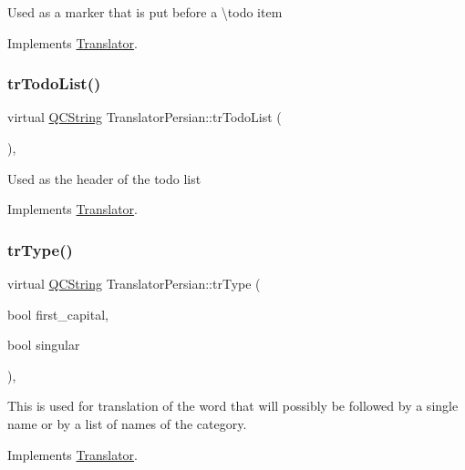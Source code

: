 Used as a marker that is put before a \textbackslash{}todo item 

Implements \mbox{\hyperlink{class_translator}{Translator}}.

\mbox{\label{class_translator_persian_aab0a2e82545289bc3d0695d290f8fd64}} 
\subsubsection{\texorpdfstring{trTodoList()}{trTodoList()}}
{\footnotesize\ttfamily virtual \mbox{\hyperlink{class_q_c_string}{Q\+C\+String}} Translator\+Persian\+::tr\+Todo\+List (\begin{DoxyParamCaption}{ }\end{DoxyParamCaption})\hspace{0.3cm}{\ttfamily [inline]}, {\ttfamily [virtual]}}

Used as the header of the todo list 

Implements \mbox{\hyperlink{class_translator}{Translator}}.

\mbox{\label{class_translator_persian_ac61885d4032e8e00d3d96037cccc7959}} 
\subsubsection{\texorpdfstring{trType()}{trType()}}
{\footnotesize\ttfamily virtual \mbox{\hyperlink{class_q_c_string}{Q\+C\+String}} Translator\+Persian\+::tr\+Type (\begin{DoxyParamCaption}\item[{bool}]{first\+\_\+capital,  }\item[{bool}]{singular }\end{DoxyParamCaption})\hspace{0.3cm}{\ttfamily [inline]}, {\ttfamily [virtual]}}

This is used for translation of the word that will possibly be followed by a single name or by a list of names of the category. 

Implements \mbox{\hyperlink{class_translator}{Translator}}.

\mbox{\label{class_translator_persian_ad49db74cbe27a29d473ac9bd126b04c0}} 
